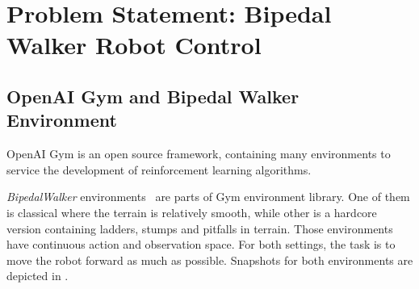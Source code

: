 \section{Problem Statement: Bipedal Walker Robot Control}
\label{sec:problem_statement}

\subsection{OpenAI Gym and Bipedal Walker Environment}
\label{ssec:gym_bipedal}

OpenAI Gym \cite{brockman_openai_2016} is an open source framework, 
containing many environments to service the development of 
reinforcement learning algorithms. 

\textit{BipedalWalker} environments~\cite{noauthor_bipedalwalker-v2_2021, noauthor_bipedalwalkerhardcore-v2_2021} are parts of Gym environment library. 
One of them is classical where the terrain is relatively smooth, while other is a hardcore version containing ladders, stumps and pitfalls in terrain. 
Those environments have continuous action and observation space. 
For both settings, the task is to move the robot forward as much as possible. 
Snapshots for both environments are depicted in .
